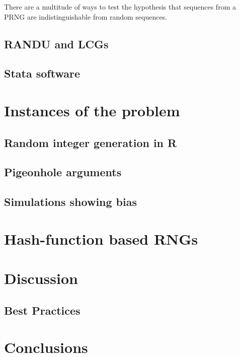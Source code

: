 \documentclass[12pt]{article}
\newcommand{\todo}[1]{{\color{red}{TO DO: \sc #1}}}
\begin{document}
There are a multitude of ways to test the hypothesis that sequences from a PRNG are indistinguishable 
from random sequences.
\todo{list types of tests + citations: L'Ecuyer Simard TestU01 (2007),  Knuth (1969), Marsaglia DIEHARD tests (1968)}



\subsection{RANDU and LCGs}
\subsection{Stata software}
\section{Instances of the problem}
\subsection{Random integer generation in R}
\subsection{Pigeonhole arguments}
\subsection{Simulations showing bias}
\section{Hash-function based RNGs}
\section{Discussion}
\subsection{Best Practices}
\section{Conclusions}
\end{document}
